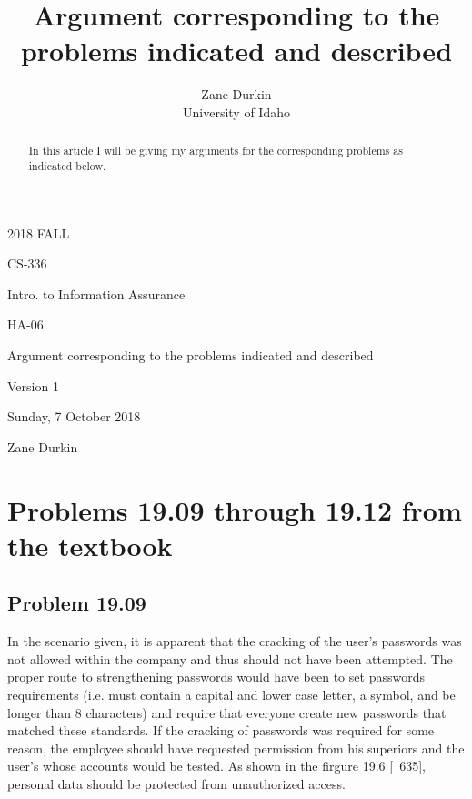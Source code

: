 \documentclass[14pt]{article}
\begin{document}
\title{Argument corresponding to the problems indicated and described}

\author{Zane Durkin\\
    University of Idaho}
\begin{description}[leftmargin=!, labelwidth=\widthof{\bfseries Author(s) Name(s)}]
\item [Year and Semester] 2018 FALL
\item [Course Number] CS-336
\item [Course Title] Intro. to Information Assurance
\item [Work Number] HA-06
\item [Work Name] Argument corresponding to the problems indicated and described
\item [Work Version] Version 1
\item [Long Date] Sunday, 7 October 2018
\item [Author(s) Name(s)] Zane Durkin
\end{description}
\begin{abstract}
In this article I will be giving my arguments for the corresponding problems as indicated below.
\end{abstract}

\section{Problems 19.09 through 19.12 from the textbook \cite{stallings}}
\subsection{Problem 19.09}
In the scenario given, it is apparent that the cracking of the user's passwords was not allowed within the company and thus should not have been attempted. The proper route to strengthening passwords would have been to set passwords requirements (i.e. must contain a capital and lower case letter, a symbol, and be longer than 8 characters) and require that everyone create new passwords that matched these standards. If the cracking of passwords was required for some reason, the employee should have requested permission from his superiors and the user's whose accounts would be tested. As shown in the firgure 19.6 \cite{stallings}[~635], personal data should be protected from unauthorized access.
\newpage
\end{document}
